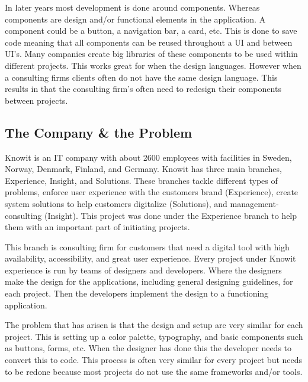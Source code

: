 In later years most development is done around components. Whereas components are design and/or functional elements in the application. A component could be a button, a navigation bar, a card\cite{babichSimpleDesignTips2020}, etc. This is done to save code meaning that all components can be reused throughout a UI and between UI's. Many companies create big libraries of these components to be used within different projects. This works great for when the design languages. However when a consulting firms clients often do not have the same design language. This results in that the consulting firm's often need to redesign their components between projects. 





\subsection{The Company \& the Problem}
Knowit is an IT company with about 2600 employees with facilities in Sweden, Norway, Denmark, Finland, and Germany. Knowit has three main branches, Experience, Insight, and Solutions. These branches tackle different types of problems, enforce user experience with the customers brand (Experience), create system solutions to help customers digitalize (Solutions), and management-consulting (Insight). This project was done under the Experience branch to help them with an important part of initiating projects.

This branch is consulting firm for customers that need a digital tool with high availability, accessibility, and great user experience. Every project under Knowit experience is run by teams of designers and developers. Where the designers make the design for the applications, including general designing guidelines, for each project. Then the developers implement the design to a functioning application.  

The problem that has arisen is that the design and setup are very similar for each project. This is setting up a color palette, typography, and basic components such as buttons, forms, etc. When the designer has done this the developer needs to convert this to code. This process is often very similar for every project but needs to be redone because most projects do not use the same frameworks and/or tools. 

